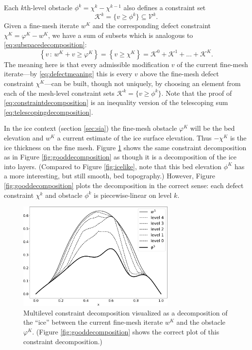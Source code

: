 \documentclass[letterpaper,final,12pt,reqno]{amsart}
\theoremstyle{claim}
\numberwithin{equation}{section}
\numberwithin{figure}{section}
\numberwithin{table}{section}
\begin{document}
Each $k$th-level obstacle $\phi^k = \chi^k - \chi^{k-1}$ also defines a constraint set
\begin{equation}
  \mathcal{K}^k = \{v \ge \phi^k\} \subseteq \mathcal{V}^k.  \label{eq:levelconstraint}
\end{equation}
Given a fine-mesh iterate $w^K$ and the corresponding defect constraint $\chi^K = \varphi^K - w^K$, we have a sum of subsets which is analogous to \eqref{eq:subspacedecomposition}:
\begin{equation}
  \left\{v\,:\,w^K + v \ge \varphi^K\right\} = \left\{v \ge \chi^K\right\} = \mathcal{K}^0 + \mathcal{K}^1 + \dots + \mathcal{K}^K. \label{eq:constraintdecomposition}
\end{equation}
The meaning here is that every admissible modification $v$ of the current fine-mesh iterate---by \eqref{eq:defectmeaning} this is every $v$ above the fine-mesh defect constraint $\chi^K$---can be built, though not uniquely, by choosing an element from each of the mesh-level constraint sets $\mathcal{K}^k = \{v \ge \phi^k\}$.  Note that the proof of \eqref{eq:constraintdecomposition} is an inequality version of the telescoping sum \eqref{eq:telescopingdecomposition}.

In the ice context (section \ref{sec:sia}) the fine-mesh obstacle $\varphi^K$ will be the bed elevation and $w^K$ a current estimate of the ice surface elevation.  Thus $-\chi^K$ is the ice thickness on the fine mesh.  Figure \ref{fig:icelikedecomposition} shows the same constraint decomposition as in Figure \ref{fig:gooddecomposition} as though it is a decomposition of the ice into layers.  (Compared to Figure \ref{fig:icelike}, note that this bed elevation $\phi^K$ has a more interesting, but still smooth, bed topography.)  However, Figure \ref{fig:gooddecomposition} plots the decomposition in the correct sense: each defect constraint $\chi^k$ and obstacle $\phi^k$ is piecewise-linear on level $k$.

\begin{figure}
\includegraphics[width=0.7\textwidth]{fixfigs/icedec_defect.pdf}
\caption{Multilevel constraint decomposition visualized as a decomposition of the ``ice'' between the current fine-mesh iterate $w^K$ and the obstacle $\varphi^K$.  (Figure \ref{fig:gooddecomposition} shows the correct plot of this constraint decomposition.)}
\label{fig:icelikedecomposition}
\end{figure}
\end{document}
